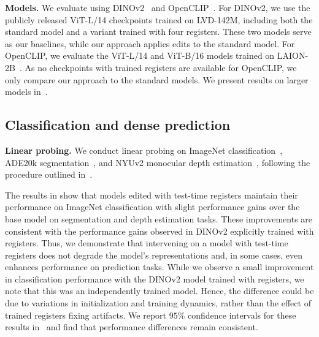 \documentclass{article}
\begin{document}
\textbf{Models.} We evaluate using DINOv2~\citep{dinov2} and OpenCLIP~\citep{openclip}. For DINOv2, we use the publicly released ViT-L/14 checkpoints trained on LVD-142M, including both the standard model and a variant trained with four registers. These two models serve as our baselines, while our approach applies edits to the standard model. For OpenCLIP, we evaluate the ViT-L/14 and ViT-B/16 models trained on LAION-2B~\citep{schuhmann2022laion}. As no checkpoints with trained registers are available for OpenCLIP, we only compare our approach to the standard models. We present results on larger models in~.







\subsection{Classification and dense prediction}
\label{sec:dense_prediction}
\textbf{Linear probing.} We conduct linear probing on ImageNet classification~\citep{imagenet}, ADE20k segmentation~\citep{ade20k}, and NYUv2 monocular depth estimation~\citep{nyud}, following the procedure outlined in~\citep{dinov2, darcet2024vision}. 

The results in  show that models edited with test-time registers maintain their performance on ImageNet classification with slight performance gains over the base model on segmentation and depth estimation tasks. 
These improvements are consistent with the performance gains observed in DINOv2 explicitly trained with registers. Thus, we demonstrate that intervening on a model with test-time registers does not degrade the model's representations and, in some cases, even enhances performance on prediction tasks. While we observe a small improvement in classification performance with the DINOv2 model trained with registers, we note that this was an independently trained model. Hence, the difference could be due to variations in initialization and training dynamics, rather than the effect of trained registers fixing artifacts. We report $95\%$ confidence intervals for these results in~ and find that performance differences remain consistent.  
\end{document}
